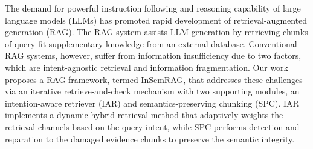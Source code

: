 The demand for powerful instruction following and reasoning capability of large language models (LLMs) has promoted rapid development of retrieval-augmented generation (RAG).
The RAG system assists LLM generation by retrieving chunks of query-fit supplementary knowledge from an external database.
Conventional RAG systems, however, suffer from information insufficiency due to two factors, which are intent-agnostic retrieval and information fragmentation. 
Our work proposes a RAG framework, termed InSemRAG, that addresses these challenges via an iterative retrieve-and-check mechanism with two supporting modules, an intention-aware retriever (IAR) and semantics-preserving chunking (SPC).
IAR implements a dynamic hybrid retrieval method that adaptively weights the retrieval channels based on the query intent, while SPC performs detection and reparation to the damaged evidence chunks to preserve the semantic integrity.
